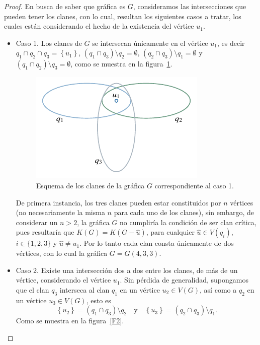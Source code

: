 \documentclass[12pt]{book}
\theoremstyle{definition}
\begin{document}
\begin{proof}
En busca de saber que gráfica es $G$, consideramos las intersecciones que pueden tener los clanes, con lo cual, resultan los siguientes casos a tratar, los cuales están considerando el hecho de la existencia del vértice $u_1$.
\begin{itemize}
\item Caso 1. 
Los clanes de $G$ se intersecan únicamente en el vértice $u_1$, es decir $q_1\cap q_2\cap q_3=\left\{u_1\right\}$, $(q_1\cap q_3)\setminus q_2=\emptyset  \text{, }(q_2\cap q_3)\setminus q_1=\emptyset$ y $(q_1\cap q_2)\setminus q_3=\emptyset$, como se muestra en la figura~\ref{F1}.

\begin{figure}[!htbp]
	\centering
	\includegraphics[scale=1.2]{Fig1.pdf}
	\caption{Esquema de los clanes de la gráfica $G$ correspondiente al caso 1.\label{F1}}
\end{figure}

De primera instancia, los tres clanes pueden estar constituidos por $n$ vértices (no necesariamente la misma $n$ para cada uno de los clanes), sin embargo, de considerar un $n>2$, la gráfica $G$ no cumpliría la condición de ser clan crítica, pues resultaría que $K(G)=K(G-\hat{u})$, para cualquier $\hat{u}\in V(q_i)$, $i\in\{1,2,3\}$ y $\hat{u}\neq u_1$. Por lo tanto cada clan consta únicamente de dos vértices, con lo cual la gráfica $G=G(4,3,3)$.

\item Caso 2.
Existe una intersección dos a dos entre los clanes, de más de un vértice, considerando el vértice $u_1$. Sin pérdida de generalidad, supongamos que el clan $q_3$ interseca al clan $q_1$ en un vértice $u_2\in V(G)$, así como a $q_2$ en un vértice $u_3\in V(G)$, esto es 
\begin{equation}\label{E1.1}
\left\{u_2\right\}=(q_1\cap q_3)\setminus q_2 \quad \text{y} \quad \left\{u_3\right\}=(q_2\cap q_3)\setminus q_1.
\end{equation}
Como se muestra en la figura~\ref{F2}.


\end{itemize}
\end{proof}
\end{document}
